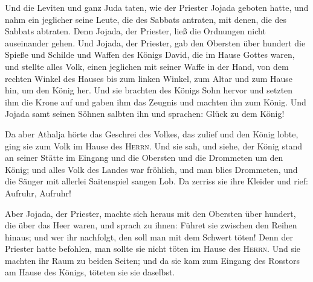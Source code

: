  Und die Leviten und ganz Juda taten, wie der Priester
Jojada geboten hatte, und nahm ein jeglicher seine Leute, die des
Sabbats antraten, mit denen, die des Sabbats abtraten. Denn Jojada, der
Priester, ließ die Ordnungen nicht auseinander gehen.  Und
Jojada, der Priester, gab den Obersten über hundert die Spieße und
Schilde und Waffen des Königs David, die im Hause Gottes waren,
 und stellte alles Volk, einen jeglichen mit seiner Waffe
in der Hand, von dem rechten Winkel des Hauses bis zum linken Winkel,
zum Altar und zum Hause hin, um den König her.  Und sie
brachten des Königs Sohn hervor und setzten ihm die Krone auf und gaben
ihm das Zeugnis und machten ihn zum König. Und Jojada samt seinen Söhnen
salbten ihn und sprachen: Glück zu dem König!

 Da aber Athalja hörte das Geschrei des Volkes, das
zulief und den König lobte, ging sie zum Volk im Hause des
\textsc{Herrn}.  Und sie sah, und siehe, der König stand
an seiner Stätte im Eingang und die Obersten und die Drommeten um den
König; und alles Volk des Landes war fröhlich, und man blies Drommeten,
und die Sänger mit allerlei Saitenspiel sangen Lob. Da zerriss sie ihre
Kleider und rief: Aufruhr, Aufruhr!

 Aber Jojada, der Priester, machte sich heraus mit den
Obersten über hundert, die über das Heer waren, und sprach zu ihnen:
Führet sie zwischen den Reihen hinaus; und wer ihr nachfolgt, den soll
man mit dem Schwert töten! Denn der Priester hatte befohlen, man sollte
sie nicht töten im Hause des \textsc{Herrn}.  Und sie
machten ihr Raum zu beiden Seiten; und da sie kam zum Eingang des
Rosstors am Hause des Königs, töteten sie sie daselbst.


